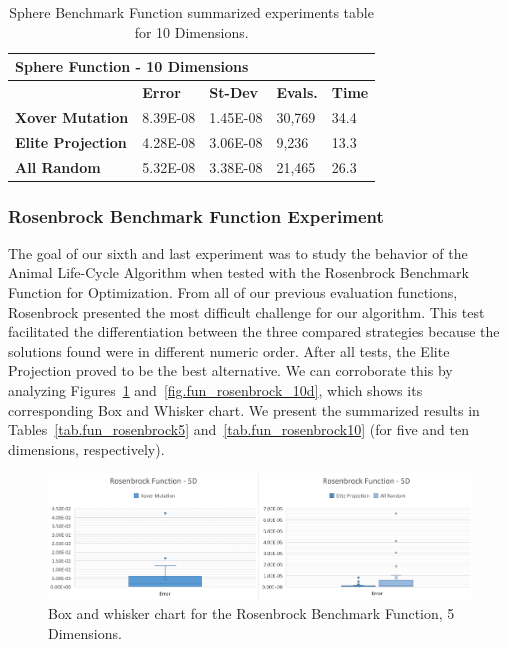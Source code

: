 \documentclass[graybox]{svmult}
\begin{document}
            \begin{table}[]
                \scriptsize
                \centering
                \caption{Sphere Benchmark Function summarized experiments table for 10 Dimensions.}\label{tab.fun_sphere10}
                \begin{tabular}{@{}lllll@{}}
                \toprule
                \multicolumn{5}{l}{\textbf{Sphere Function - 10 Dimensions}} \\ \midrule
                & \textbf{Error} & \textbf{St-Dev} & \textbf{Evals.} & \textbf{Time} \\
                \textbf{Xover Mutation} & 8.39E-08 & 1.45E-08 & 30,769 & 34.4 \\
                \textbf{Elite Projection} & 4.28E-08 & 3.06E-08 & 9,236 & 13.3 \\
                \textbf{All Random} & 5.32E-08 & 3.38E-08 & 21,465 & 26.3 \\ \bottomrule
                \end{tabular}
                \end{table}

            \FloatBarrier


        \subsubsection{Rosenbrock Benchmark Function Experiment}

            The goal of our sixth and last experiment was to study the behavior
            of the Animal Life-Cycle Algorithm when tested with the Rosenbrock
            Benchmark Function for Optimization. From all of our previous
            evaluation functions, Rosenbrock presented the most difficult
            challenge for our algorithm. This test facilitated the
            differentiation between the three compared strategies because the
            solutions found were in different numeric order. After all tests,
            the Elite Projection proved to be the best alternative. We can
            corroborate this by analyzing Figures~\ref{fig.fun_rosenbrock_5d}
            and~\ref{fig.fun_rosenbrock_10d}, which shows its corresponding Box
            and Whisker chart. We present the summarized results in
            Tables~\ref{tab.fun_rosenbrock5} and~\ref{tab.fun_rosenbrock10}
            (for five and ten dimensions, respectively).

            \begin{figure}
                \includegraphics[width=0.99\linewidth, frame]{img/fig_fun_rosenbrock_5d.pdf}
                \caption{Box and whisker chart for the Rosenbrock Benchmark Function, 5 Dimensions.} \label{fig.fun_rosenbrock_5d}
                \end{figure}
\end{document}
